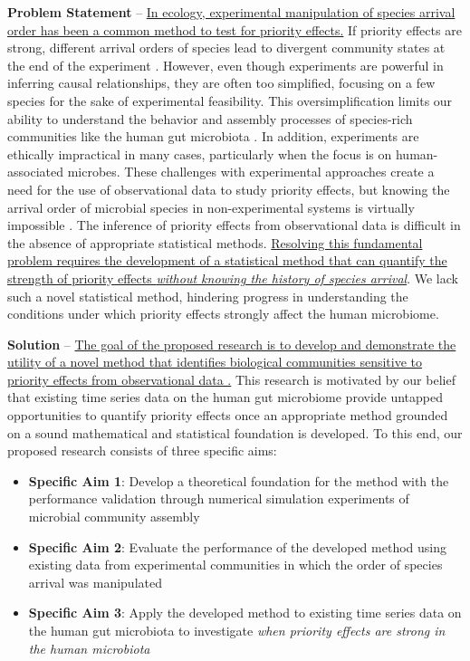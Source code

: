 \documentclass[12pt, class=article, crop=false]{standalone}
\begin{document}
\textbf{Problem Statement} --
\ul{In ecology, experimental manipulation of species arrival order has been a common method to test for priority effects.}
If priority effects are strong, different arrival orders of species lead to divergent community states at the end of the experiment \citep{fukami_historical_2015, sprockett_role_2018}.
However, even though experiments are powerful in inferring causal relationships, they are often too simplified, focusing on a few species for the sake of experimental feasibility.
This oversimplification limits our ability to understand the behavior and assembly processes of species-rich communities like the human gut microbiota \citep{fierer_animalcules_2012}. 
In addition, experiments are ethically impractical in many cases, particularly when the focus is on human-associated microbes. 
These challenges with experimental approaches create a need for the use of observational data to study priority effects, but knowing the arrival order of microbial species in non-experimental systems is virtually impossible  \citep{sprockett_role_2018}.
The inference of priority effects from observational data is difficult in the absence of appropriate statistical methods.
\ul{Resolving this fundamental problem requires the development of a statistical method that can quantify the strength of priority effects \textit{without knowing the history of species arrival}}.
We lack such a novel statistical method, hindering progress in understanding the conditions under which priority effects strongly affect the human microbiome.

\textbf{Solution} --
\ul{The goal of the proposed research is to develop and demonstrate the utility of a novel method that identifies biological communities sensitive to priority effects from observational data .}
This research is motivated by our belief that existing time series data on the human gut microbiome provide untapped opportunities to quantify priority effects once an appropriate method grounded on a sound mathematical and statistical foundation is developed.
To this end, our proposed research consists of three specific aims:

\begin{itemize}
    \item \textbf{Specific Aim 1}:  Develop a theoretical foundation for the method with the performance validation through numerical simulation experiments of microbial community assembly
    \item \textbf{Specific Aim 2}: Evaluate the performance of the developed method using existing data from experimental communities in which the order of species arrival was manipulated
    \item \textbf{Specific Aim 3}: Apply the developed method to existing time series data on the human gut microbiota to investigate \textit{when priority effects are strong in the human microbiota}
\end{itemize}
\end{document}
